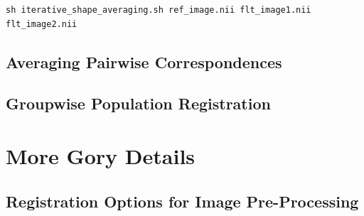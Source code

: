 \documentclass{InsightArticle}
\begin{document}
\begin{verbatim}
sh iterative_shape_averaging.sh ref_image.nii flt_image1.nii  flt_image2.nii
\end{verbatim}

\subsection{Averaging Pairwise Correspondences}

\cite{GuimMeunThir:2000}

\cite{JeffPottChan:2007}

\subsection{Groupwise Population Registration}

\cite{Learned-Miller:2006}
\cite{BalcGollShen:2007}
\cite{RohlZahrSull:2008,RohlZahrSull:2010}

\clearpage
\section{More Gory Details}

\subsection{Registration Options for Image Pre-Processing}
\end{document}
